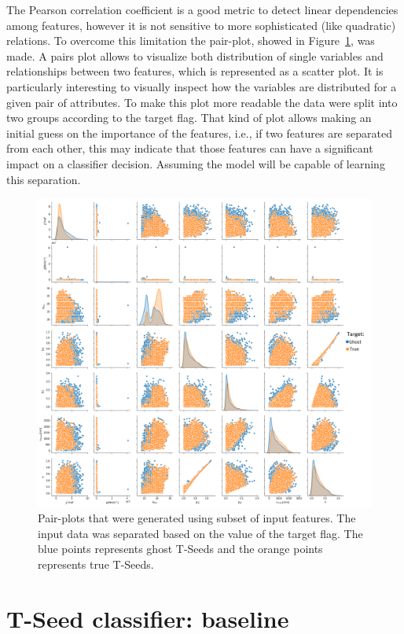 The Pearson correlation coefficient is a good metric to detect linear dependencies among features, however it is not sensitive to more sophisticated (like quadratic) relations. To overcome this limitation the pair-plot, showed in Figure~\ref{fig:Pair plot}, was made. A pairs plot allows to visualize both distribution of single variables and relationships between two features, which is represented as a scatter plot. It is particularly interesting to visually inspect how the variables are distributed for a given pair of attributes. To make this plot more readable the data were split into two groups according to the target flag. That kind of plot allows making an initial guess on the importance of the features, i.e., if two features are separated from each other, this may indicate that those features can have a significant impact on a classifier decision. Assuming the model will be capable of learning this separation.   

\begin{figure}[!h]
\centering
\includegraphics[width=\textwidth]{figures/pair_plot.png}
\caption{Pair-plots that were generated using subset of input features. The input data was separated based on the value of the target flag. The blue points represents ghost T-Seeds and the orange points represents true T-Seeds. }
\label{fig:Pair plot}
\end{figure}

\section{T-Seed classifier: baseline}

